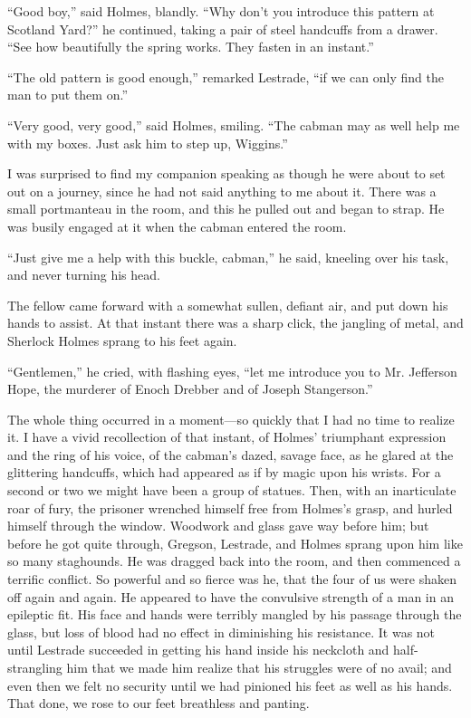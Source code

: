 \documentclass[12pt]{book}
\begin{document}
“Good boy,” said Holmes, blandly. “Why don’t you introduce this pattern at Scotland Yard?” he continued, taking a pair of steel handcuffs from a drawer. “See how beautifully the spring works. They fasten in an instant.” 

“The old pattern is good enough,” remarked Lestrade, “if we can only find the man to put them on.” 

“Very good, very good,” said Holmes, smiling. “The cabman may as well help me with my boxes. Just ask him to step up, Wiggins.” 

I was surprised to find my companion speaking as though he were about to set out on a journey, since he had not said anything to me about it. There was a small portmanteau in the room, and this he pulled out and began to strap. He was busily engaged at it when the cabman entered the room. 

“Just give me a help with this buckle, cabman,” he said, kneeling over his task, and never turning his head. 

The fellow came forward with a somewhat sullen, defiant air, and put down his hands to assist. At that instant there was a sharp click, the jangling of metal, and Sherlock Holmes sprang to his feet again. 

“Gentlemen,” he cried, with flashing eyes, “let me introduce you to Mr. Jefferson Hope, the murderer of Enoch Drebber and of Joseph Stangerson.” 

The whole thing occurred in a moment—so quickly that I had no time to realize it. I have a vivid recollection of that instant, of Holmes’ triumphant expression and the ring of his voice, of the cabman’s dazed, savage face, as he glared at the glittering handcuffs, which had appeared as if by magic upon his wrists. For a second or two we might have been a group of statues. Then, with an inarticulate roar of fury, the prisoner wrenched himself free from Holmes’s grasp, and hurled himself through the window. Woodwork and glass gave way before him; but before he got quite through, Gregson, Lestrade, and Holmes sprang upon him like so many staghounds. He was dragged back into the room, and then commenced a terrific conflict. So powerful and so fierce was he, that the four of us were shaken off again and again. He appeared to have the convulsive strength of a man in an epileptic fit. His face and hands were terribly mangled by his passage through the glass, but loss of blood had no effect in diminishing his resistance. It was not until Lestrade succeeded in getting his hand inside his neckcloth and half-strangling him that we made him realize that his struggles were of no avail; and even then we felt no security until we had pinioned his feet as well as his hands. That done, we rose to our feet breathless and panting. 
\end{document}
